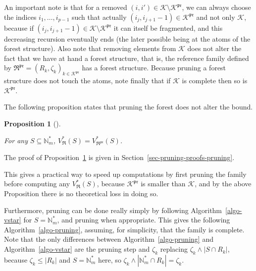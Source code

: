 \documentclass[
  11pt,
  a4paper,
]{article}
\theoremstyle{plain}
\theoremstyle{definition}
\theoremstyle{plain}
\theoremstyle{definition}
\theoremstyle{plain}
\newtheorem{proposition}{Proposition}[section]
\theoremstyle{remark}
\begin{document}
An important note is that for a removed
\((i,i')\in\mathcal{K}\setminus\mathcal{K}^{\mathfrak{pr}}\), we can
always choose the indices \(i_1,\dotsc,i_{p-1}\) such that actually
\((i_j,i_{j+1}-1)\in\mathcal{K}^{\mathfrak{pr}}\) and not only
\(\mathcal{K}\), because if
\((i_j,i_{j+1}-1)\in\mathcal{K}\setminus\mathcal{K}^{\mathfrak{pr}}\) it
can itself be fragmented, and this decreasing recursion eventually ends
(the later possible being at the atoms of the forest structure). Also
note that removing elements from \(\mathcal{K}\) does not alter the fact
that we have at hand a forest structure, that is, the reference family
defined by
\(\mathfrak{R}^{\mathfrak{pr}}=(R_k,\zeta_k)_{k\in\mathcal{K}^{\mathfrak{pr}}}\)
has a forest structure. Because pruning a forest structure does not
touch the atoms, note finally that if \(\mathcal{K}\) is complete then
so is \(\mathcal{K}^{\mathfrak{pr}}\).

The following proposition states that pruning the forest does not alter
the bound.

\begin{proposition}[]\protect\hypertarget{prp-pruning}{}\label{prp-pruning}

For any \(S\subseteq \mathbb{N}_m^*\),
\(V^*_{\mathfrak{R}}(S)=V^*_{\mathfrak{R}^{\mathfrak{pr}}}(S)\).

\end{proposition}

The proof of Proposition~\ref{prp-pruning} is given in
Section~\ref{sec-pruning-proofs-pruning}.

This gives a practical way to speed up computations by first pruning the
family before computing any \(V^*_{\mathfrak{R}}(S)\), because
\(\mathcal{K}^{\mathfrak{pr}}\) is smaller than \(\mathcal{K}\), and by
the above Proposition there is no theoretical loss in doing so.

Furthermore, pruning can be done really simply by following
Algorithm~\ref{algo-vstar} for \(S=\mathbb{N}_m^*\), and pruning when
appropriate. This gives the following Algorithm~\ref{algo-pruning},
assuming, for simplicity, that the family is complete. Note that the
only differences between Algorithm~\ref{algo-pruning} and
Algorithm~\ref{algo-vstar} are the pruning step and \(\zeta_k\)
replacing \(\zeta_k\wedge|S\cap R_k|\), because \(\zeta_k\leq|R_k|\) and
\(S=\mathbb{N}_m^*\) here, so
\(\zeta_k\wedge|\mathbb{N}_m^*\cap R_k|=\zeta_k\).
\end{document}
